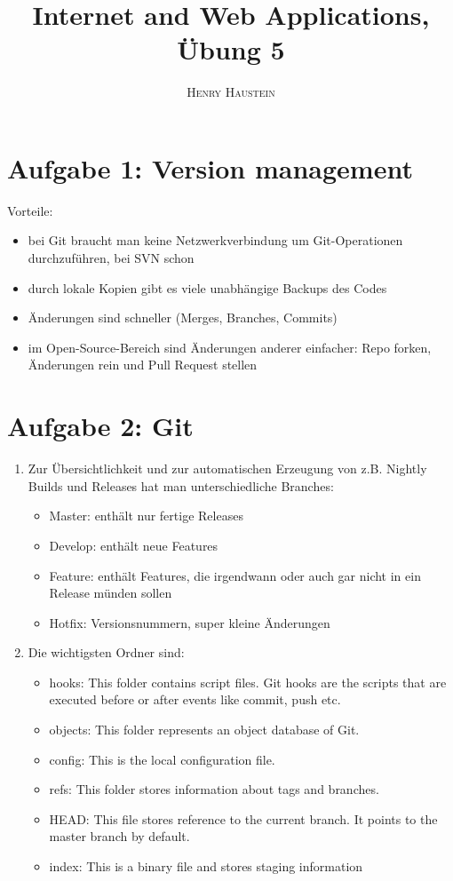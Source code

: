 \documentclass{article}
\title{\textbf{Internet and Web Applications, Übung 5}}
\author{\textsc{Henry Haustein}}
\date{}
\begin{document}
	\maketitle
	
	\section*{Aufgabe 1: Version management}
	Vorteile:
	\begin{itemize}
		\item bei Git braucht man keine Netzwerkverbindung um Git-Operationen durchzuführen, bei SVN schon
		\item durch lokale Kopien gibt es viele unabhängige Backups des Codes
		\item Änderungen sind schneller (Merges, Branches, Commits)
		\item im Open-Source-Bereich sind Änderungen anderer einfacher: Repo forken, Änderungen rein und Pull Request stellen
	\end{itemize}
	
	\section*{Aufgabe 2: Git}
	\begin{enumerate}[label=(\alph*)]
		\item Zur Übersichtlichkeit und zur automatischen Erzeugung von z.B. Nightly Builds und Releases hat man unterschiedliche Branches:
		\begin{itemize}
			\item Master: enthält nur fertige Releases
			\item Develop: enthält neue Features
			\item Feature: enthält Features, die irgendwann oder auch gar nicht in ein Release münden sollen
			\item Hotfix: Versionsnummern, super kleine Änderungen
		\end{itemize}
		\item Die wichtigsten Ordner sind:
		\begin{itemize}
			\item hooks: This folder contains script files. Git hooks are the scripts that are executed before or after events like commit, push etc.
			\item objects: This folder represents an object database of Git.
			\item config: This is the local configuration file.
			\item refs: This folder stores information about tags and branches.
			\item HEAD: This file stores reference to the current branch. It points to the master branch by default.
			\item index: This is a binary file and stores staging information
		\end{itemize}
	\end{enumerate}
\end{document}
